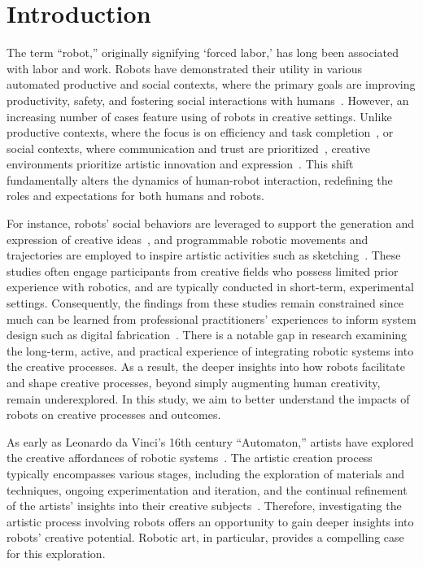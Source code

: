 \section{Introduction}

The term ``robot,'' originally signifying `forced labor,' has long been associated with labor and work. Robots have demonstrated their utility in various automated productive and social contexts, where the primary goals are improving productivity, safety, and fostering social interactions with humans~\cite{simoes2022designing, weidemann2021role, honig2018understanding}. However, an increasing number of cases feature using of robots in creative settings. Unlike productive contexts, where the focus is on efficiency and task completion~\cite{arents2022smart}, or social contexts, where communication and trust are prioritized~\cite{nam2020trust, saunderson2019robots}, creative environments prioritize artistic innovation and expression~\cite{hsueh2024counts}. This shift fundamentally alters the dynamics of human-robot interaction, redefining the roles and expectations for both humans and robots.

For instance, robots’ social behaviors are leveraged to support the generation and expression of creative ideas~\cite{hu2021exploring, sandoval2022human, alves2020creativity}, and programmable robotic movements and trajectories are employed to inspire artistic activities such as sketching~\cite{lin2020your}. These studies often engage participants from creative fields who possess limited prior experience with robotics, and are typically conducted in short-term, experimental settings. Consequently, the findings from these studies remain constrained since much can be learned from professional practitioners' experiences to inform system design such as digital fabrication~\cite{hirsch2023nothing}. There is a notable gap in research examining the long-term, active, and practical experience of integrating robotic systems into the creative processes. As a result, the deeper insights into how robots facilitate and shape creative processes, beyond simply augmenting human creativity, remain underexplored. In this study, we aim to better understand the impacts of robots on creative processes and outcomes.

As early as Leonardo da Vinci's 16th century ``Automaton,'' artists have explored the creative affordances of robotic systems~\cite{shanken2002cybernetics, pagliarini2009development, jeon2017robotic}. The artistic creation process typically encompasses various stages, including the exploration of materials and techniques, ongoing experimentation and iteration, and the continual refinement of the artists' insights into their creative subjects~\cite{lewis2023art, sturdee2022state}. Therefore, investigating the artistic process involving robots offers an opportunity to gain deeper insights into robots' creative potential. Robotic art, in particular, provides a compelling case for this exploration.

